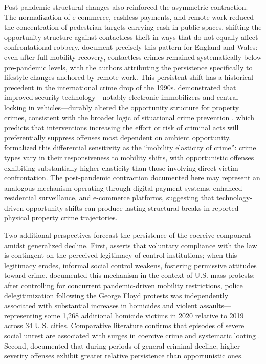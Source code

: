 \documentclass[pdflatex,sn-basic]{sn-jnl}
\begin{document}
Post-pandemic structural changes also reinforced the asymmetric contraction. The normalization of e-commerce, cashless payments, and remote work reduced the concentration of pedestrian targets carrying cash in public spaces, shifting the opportunity structure against contactless theft in ways that do not equally affect confrontational robbery. \citet{seyidoglu2024} document precisely this pattern for England and Wales: even after full mobility recovery, contactless crimes remained systematically below pre-pandemic levels, with the authors attributing the persistence specifically to lifestyle changes anchored by remote work. This persistent shift has a historical precedent in the international crime drop of the 1990s. \citet{farrell2011} demonstrated that improved security technology---notably electronic immobilizers and central locking in vehicles---durably altered the opportunity structure for property crimes, consistent with the broader logic of situational crime prevention \citep{clarke1995}, which predicts that interventions increasing the effort or risk of criminal acts will preferentially suppress offenses most dependent on ambient opportunity. \citet{halford2020} formalized this differential sensitivity as the ``mobility elasticity of crime'': crime types vary in their responsiveness to mobility shifts, with opportunistic offenses exhibiting substantially higher elasticity than those involving direct victim confrontation. The post-pandemic contraction documented here may represent an analogous mechanism operating through digital payment systems, enhanced residential surveillance, and e-commerce platforms, suggesting that technology-driven opportunity shifts can produce lasting structural breaks in reported physical property crime trajectories.

Two additional perspectives forecast the persistence of the coercive component amidst generalized decline. First, \citet{tyler2006} asserts that voluntary compliance with the law is contingent on the perceived legitimacy of control institutions; when this legitimacy erodes, informal social control weakens, fostering permissive attitudes toward crime. \citet{rosenfeld2021} documented this mechanism in the context of U.S. mass protests: after controlling for concurrent pandemic-driven mobility restrictions, police delegitimization following the George Floyd protests was independently associated with substantial increases in homicides and violent assaults---representing some 1,268 additional homicide victims in 2020 relative to 2019 across 34 U.S. cities. Comparative literature confirms that episodes of severe social unrest are associated with surges in coercive crime and systematic looting \citep{bell2014,mongale2022}. Second, \citet{blumstein1988} documented that during periods of general criminal decline, higher-severity offenses exhibit greater relative persistence than opportunistic ones.
\end{document}
